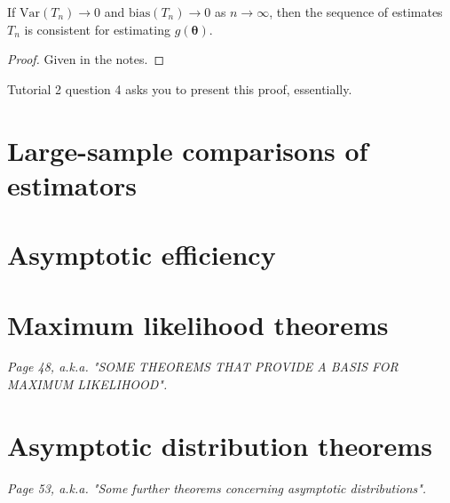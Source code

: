\begin{theorem}[Consistent]\label{thm:consistent}
    If \(\text{Var}(T_n)\to 0\) and \(\text{bias}(T_n)\to 0\) as \(n\to\infty\), then the sequence of estimates \(T_n\) is consistent for estimating \(g(\bm{\theta})\). 
\end{theorem}

\begin{proof}
    Given in the notes.
\end{proof}

\begin{exercise}
    Tutorial 2 question 4 asks you to present this proof, essentially. 
\end{exercise}


\section{Large-sample comparisons of estimators}\label{sec:large-sample comps}


\section{Asymptotic efficiency}\label{sec:asymptotic efficiency}



\section{Maximum likelihood theorems}\label{sec:ML thms}

\textit{Page 48, a.k.a. "SOME THEOREMS THAT PROVIDE A BASIS FOR MAXIMUM LIKELIHOOD".}




\section{Asymptotic distribution theorems}\label{sec:asymptotic thms}

\textit{Page 53, a.k.a. "Some further theorems concerning asymptotic distributions".}




